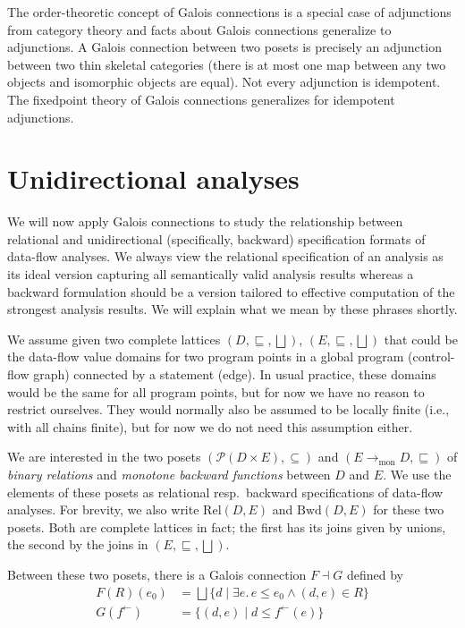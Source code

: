 \documentclass{llncs}
\newcommand{\Pow}{\mathcal{P}}
\newcommand{\Rel}{\mathrm{Rel}}
\newcommand{\Bwd}{\mathrm{Bwd}}
\newcommand{\tomon}{\to_{\mathrm{mon}}}
\newcommand{\fb}{{f^{\leftarrow}}}
\newcommand{\bigjoin}{\bigsqcup}
\newcommand{\sqleq}{\sqsubseteq}
\begin{document}
The order-theoretic concept of Galois connections is a special case of
adjunctions from category theory and facts about Galois connections
generalize to adjunctions. A Galois connection between two posets is
precisely an adjunction between two thin skeletal categories (there is
at most one map between any two objects and isomorphic objects are
equal). Not every adjunction is idempotent. The fixedpoint theory of
Galois connections generalizes for idempotent adjunctions.


\section{Unidirectional analyses}

We will now apply Galois connections to study the relationship between
relational and unidirectional (specifically, backward) specification
formats of data-flow analyses. We always view the relational
specification of an analysis as its ideal version capturing all
semantically valid analysis results whereas a backward formulation
should be a version tailored to effective computation of the strongest
analysis results. We will explain what we mean by these phrases
shortly.

We assume given two complete lattices $(D, \sqleq, \bigjoin)$,
$(E, \sqleq, \bigjoin)$ that could be the data-flow value domains for
two program points in a global program (control-flow graph) connected
by a statement (edge). In usual practice, these domains would be the
same for all program points, but for now we have no reason to restrict
ourselves. They would normally also be assumed to be locally finite
(i.e., with all chains finite), but for now we do not need this
assumption either.

We are interested in the two posets $(\Pow(D \times E), \subseteq)$ and
$(E \tomon D, \sqleq)$ of \emph{binary relations} and \emph{monotone
  backward functions} between $D$ and $E$. We use the elements of
these posets as relational resp.\ backward specifications of data-flow
analyses. For brevity, we also write $\Rel(D, E)$ and $\Bwd(D, E)$
for these two posets. Both are complete lattices in fact; the first
has its joins given by unions, the second by the joins in
$(E, \sqleq, \bigjoin)$.

Between these two posets, there is a Galois connection $F \dashv G$
defined by
\begin{align*}
    F (R)(e_{0}) &= \bigjoin \{ d \mid \exists e.\, e \leq e_{0}  \land (d , e) \in R \} \\
    G (\fb) &= \{ (d , e) \mid d \leq \fb(e) \}
\end{align*}
\end{document}
